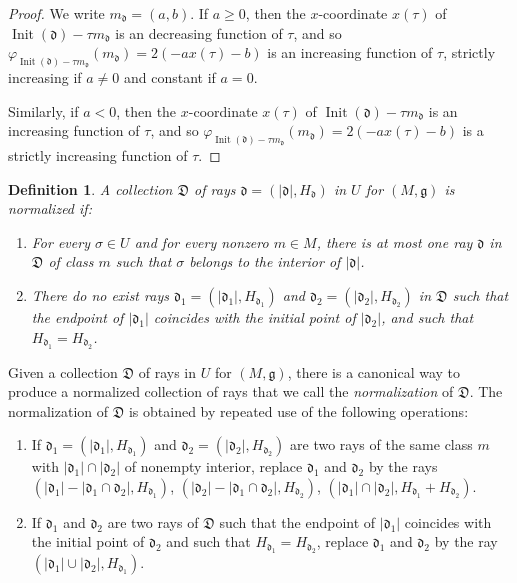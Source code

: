 \documentclass[12pt, a4paper]{amsart}
\newtheorem{defn}{Definition}[section]
\newcommand\fd{\mathfrak d}
\newcommand\fD{\mathfrak D}
\newcommand\fg{\mathfrak g}
\newcommand\Init{\operatorname{Init}}
\begin{document}
\begin{proof}
We write $m_\fd=(a,b)$. If $a \geqslant 0$, then the $x$-coordinate $x(\tau)$ of $\Init(\fd)-\tau m_\fd$
is an decreasing function of $\tau$, and so 
$\varphi_{\Init(\fd)-\tau m_\fd}(m_\fd)=2(-ax(\tau)-b)$ is an increasing function of $\tau$, strictly increasing if $a \neq 0$ and constant if $a=0$.

Similarly, if $a<0$, then the $x$-coordinate $x(\tau)$ of $\Init(\fd)-\tau m_\fd$
is an increasing function of $\tau$, and so 
$\varphi_{\Init(\fd)-\tau m_\fd}(m_\fd)=2(-ax(\tau)-b)$ is a strictly increasing function of $\tau$.
\end{proof}

\begin{defn}\label{def_normalized}
A collection $\fD$ of rays 
$\fd=(|\fd|,H_\fd)$ in $U$ for 
$(M,\fg)$ is \emph{normalized} if:
\begin{enumerate}
\item[(i)] For every $\sigma \in U$ and for every nonzero $m \in M$, there is at most 
	one ray $\fd$ in $\fD$ of class $m$ such that 
	$\sigma$ belongs to the interior of 
	$|\fd|$.
\item[(ii)] There do no exist rays $\fd_1=(|\fd_1|,H_{\fd_1})$ and $\fd_2=(|\fd_2|,H_{\fd_2})$ in $\fD$ such that the endpoint of $|\fd_1|$ coincides with the initial point of $|\fd_2|$, and such that 
$H_{\fd_1}=H_{\fd_2}$.
\end{enumerate}
\end{defn}

Given a collection 
$\fD$ of rays in $U$ for 
$(M,\fg)$, there is a canonical way to produce a normalized collection of rays that we call the 
\emph{normalization} of $\fD$. 
The normalization of $\fD$ is obtained by repeated use of the following operations:
\begin{enumerate}
\item[(i)] If $\fd_1=(|\fd_1|,H_{\fd_1})$ and $\fd_2=(|\fd_2|,H_{\fd_2})$ are two rays of the same class $m$ with $|\fd_1|\cap |\fd_2|$ of nonempty interior, replace 
$\fd_1$ and $\fd_2$ by the rays 
$(|\fd_1|-|\fd_1 \cap \fd_2|, H_{\fd_1})$,
$(|\fd_2|-|\fd_1 \cap \fd_2|, H_{\fd_2})$,
$(|\fd_1| \cap |\fd_2|, H_{\fd_1}+H_{\fd_2})$.
\item[(ii)] If $\fd_1$ and $\fd_2$ are two rays 
of $\fD$ such that the endpoint of 
$|\fd_1|$ coincides with the initial point of $\fd_2$ and such that 
$H_{\fd_1}=H_{\fd_2}$, replace 
$\fd_1$ and $\fd_2$ by the ray 
$(|\fd_1|\cup|\fd_2|,H_{\fd_1})$.
\end{enumerate}
\end{document}
